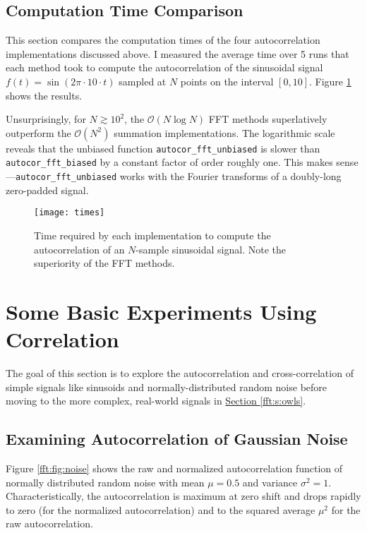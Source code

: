 \documentclass[11pt, a4paper]{article}
\begin{document}
\subsection{Computation Time Comparison} \label{fft:ss:times}
This section compares the computation times of the four autocorrelation implementations discussed above. I measured the average time over 5 runs that each method took to compute the autocorrelation of the sinusoidal signal $ f(t) = \sin(2\pi \cdot 10 \cdot t) $ sampled at $ N $ points on the interval $ [0, 10] $. Figure \ref{fft:fig:times} shows the results.

Unsurprisingly, for $ N \gtrsim 10^{2} $, the $ \mathcal{O}(N \log N) $ FFT methods superlatively outperform the $ \mathcal{O}(N^{2}) $ summation implementations. The logarithmic scale reveals that the unbiased function \texttt{autocor\_fft\_unbiased} is slower than \texttt{autocor\_fft\_biased} by a constant factor of order roughly one. This makes sense---\texttt{autocor\_fft\_unbiased} works with the Fourier transforms of a doubly-long zero-padded signal.


\begin{figure}
\centering
\texttt{[image: times]}
\vspace{-7mm}
\caption{Time required by each implementation to compute the autocorrelation of an $ N $-sample sinusoidal signal. Note the superiority of the FFT methods.}
\label{fft:fig:times}
\end{figure}


\section{Some Basic Experiments Using Correlation}
The goal of this section is to explore the autocorrelation and cross-correlation of simple signals like sinusoids and normally-distributed random noise before moving to the more complex, real-world signals in \hyperref[fft:s:owls]{Section \ref{fft:s:owls}}.

\subsection{Examining Autocorrelation of Gaussian Noise}
Figure \ref{fft:fig:noise} shows the raw and normalized autocorrelation function of normally distributed random noise with mean $ \mu = 0.5 $ and variance $ \sigma^{2} = 1 $. Characteristically, the autocorrelation is maximum at zero shift and drops rapidly to zero (for the normalized autocorrelation) and to the squared average $ \mu^{2} $ for the raw autocorrelation. 
 
\end{document}
